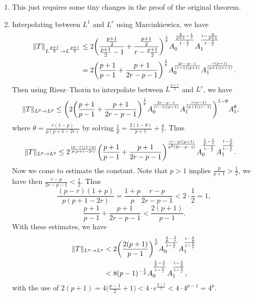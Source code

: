 \begin{enumerate}
\item[1.3.1.]
   This just requires some tiny changes in the proof of the original theorem.

\item[1.3.2. ]
   Interpolating between $L^{1}$ and $L^{r}$ using Marcinkiewicz, we have
   \begin{equation*}\begin{aligned}
   \Vert T \Vert_{L^\frac{p+1}{2}\to L^\frac{p+1}{2}} &\leq 2\bigg(\frac{\frac{p+1}{2}}{\frac{p+1}{2}-1} + \frac{\frac{p+1}{2}}{r-\frac{p+1}{2}}\bigg)^{\frac{1}{p}}A_{0}^{\frac{\frac{2}{p+1}-\frac{1}{r}}{1-\frac{1}{r}}}A_{1}^{\frac{1-\frac{2}{p+1}}{1-\frac{1}{r}}}
   \\&= 2\bigg(\frac{p+1}{p-1} + \frac{p+1}{2r-p-1}\bigg)^{\frac{1}{p}}A_{0}^{\frac{2r-p-1}{(r-1)(p+1)}}A_{1}^{\frac{r(p-1)}{(p+1)(r-1)}}.
   \end{aligned}\end{equation*}
   Then using Riesz--Thorin to interpolate between $L^{\frac{p+1}{2}}$ and $L^{r}$, we have
   \begin{equation*}\begin{aligned}
   \Vert T \Vert_{L^p\to L^p} &\leq \bigg(2\bigg(\frac{p+1}{p-1} + \frac{p+1}{2r-p-1}\bigg)^{\frac{1}{p}}A_{0}^{\frac{2r-p-1}{(r-1)(p+1)}}A_{1}^{\frac{r(p-1)}{(p+1)(r-1)}}\bigg)^{1-\theta}A_{1}^{\theta},
   \end{aligned}\end{equation*}
   where $\theta = \frac{r(1-p)}{p(p+1-2r)}$ by solving $\frac{1}{p} = \frac{2(1-\theta)}{p+1} + \frac{\theta}{r}$. Thus
   \begin{equation*}\begin{aligned}
    \Vert T \Vert_{L^p\to L^p} &\leq 2^{\frac{(p-r)(1+p)}{p(p+1-2r)}}\bigg(\frac{p+1}{p-1} + \frac{p+1}{2r-p-1}\bigg)^{\frac{(r-p)(p+1)}{p^{2}(2r-p-1)}}A_{0}^{\frac{\frac{1}{p}-\frac{1}{r}}{1-\frac{1}{r}}}A_{1}^{\frac{1-\frac{1}{p}}{1-\frac{1}{r}}}.
    \end{aligned}\end{equation*}
   Now we come to estimate the constant. Note that $p>1$ implies $\frac{p}{p+1}>\frac12$, 
   we have then $\frac{r - p}{2r - p - 1} < \frac{1}{2}$. Thus
   \[\frac{(p-r)(1+p)}{p(p+1-2r)} = \frac{1+p}{p} \frac{r - p}{2r - p - 1} < 2 \cdot \frac{1}{2} = 1,\]
   \[\frac{p+1}{p-1} + \frac{p+1}{2r-p-1} < \frac{2(p+1)}{p-1}.\]
   With these estimates, we have
   \begin{equation*}\begin{aligned}
   \Vert T \Vert_{L^p\to L^p} &< 2\bigg(\frac{2(p+1)}{p-1}\bigg)^{\frac{1}{p}}A_{0}^{\frac{\frac{1}{p}-\frac{1}{r}}{1-\frac{1}{r}}}A_{1}^{\frac{1-\frac{1}{p}}{1-\frac{1}{r}}}\\
   &< 8(p-1)^{-\frac{1}{p}}A_{0}^{\frac{\frac{1}{p}-\frac{1}{r}}{1-\frac{1}{r}}}A_{1}^{\frac{1-\frac{1}{p}}{1-\frac{1}{r}}},
   \end{aligned}\end{equation*}
   with the use of $2(p+1)=4\big(\frac{p-1}{2}+1\big)
   <4\cdot e^\frac{p-1}{2}<4\cdot4^{p-1}=4^p$.


\end{enumerate}
